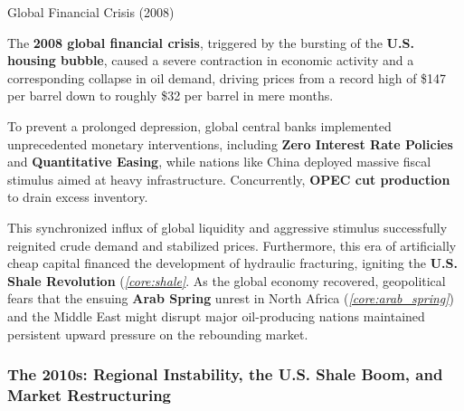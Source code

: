 \documentclass[10pt]{article}
\begin{document}
      \begin{core}[label=core:great_crash]{Global Financial Crisis (2008)}

        The \textbf{2008 global financial crisis}, triggered by the bursting of the \textbf{U.S. housing bubble}, caused a severe contraction in economic activity and a corresponding collapse in oil demand, driving prices from a record high of \$147 per barrel down to roughly \$32 per barrel in mere months.


        To prevent a prolonged depression, global central banks implemented unprecedented monetary interventions, including \textbf{Zero Interest Rate Policies} and \textbf{Quantitative Easing}, while nations like China deployed massive fiscal stimulus aimed at heavy infrastructure. Concurrently, \textbf{OPEC cut production} to drain excess inventory. 

        This synchronized influx of global liquidity and aggressive stimulus successfully reignited crude demand and stabilized prices. Furthermore, this era of artificially cheap capital financed the development of hydraulic fracturing, igniting the \textbf{U.S. Shale Revolution} (\textit{\autoref{core:shale}}. As the global economy recovered, geopolitical fears that the ensuing \textbf{Arab Spring} unrest in North Africa (\textit{\autoref{core:arab_spring}}) and the Middle East might disrupt major oil-producing nations maintained persistent upward pressure on the rebounding market.

      \end{core}

    \subsubsection{The 2010s: Regional Instability, the U.S. Shale Boom, and Market Restructuring}
\end{document}
